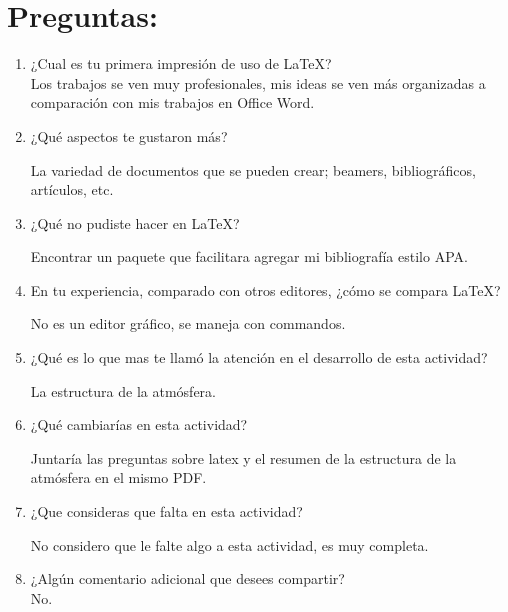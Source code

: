 \documentclass[12pt]{article}
\begin{document}
\section*{Preguntas:}
\begin{enumerate}
\item ¿Cual es tu primera impresión de uso de LaTeX?\\
Los trabajos se ven muy profesionales, mis ideas se ven más organizadas a comparación con mis trabajos en Office Word. \\

\item ¿Qué aspectos te gustaron más?

La variedad de documentos que se pueden crear; beamers, bibliográficos, artículos, etc. \\

\item ¿Qué no pudiste hacer en LaTeX?

Encontrar un paquete que facilitara agregar mi bibliografía estilo APA. \\

\item En tu experiencia, comparado con otros editores, ¿cómo se compara LaTeX? 

No es un editor gráfico, se maneja con commandos. \\

\item ¿Qué es lo que mas te llamó la atención en el desarrollo de esta actividad?

La estructura de la atmósfera. \\

\item ¿Qué cambiarías en esta actividad?

Juntaría las preguntas sobre latex y el resumen de la estructura de la atmósfera en el mismo PDF. \\

\item ¿Que consideras que falta en esta actividad? 

No considero que le falte algo a esta actividad, es muy completa.\\

\item ¿Algún comentario adicional que desees compartir? \\
No.

\end{enumerate}
\end{document}
